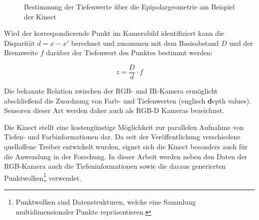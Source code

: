 
\begin{figure}[ht]
	\begin{center}
		\caption{Bestimmung der Tiefenwerte über die Epipolargeometrie am Beispiel der Kinect}
		\label{fig.kinect_depth}
	\end{center}
\end{figure}

\prever{
}

Wird der korrespondierende Punkt im Kamerabild identifiziert kann die Disparität $d = x - x'$ berechnet und zusammen mit dem Basisabstand $D$ und der Brennweite $f$ darüber der Tiefenwert des Punktes bestimmt werden:


\prever{
}

\begin{equation}
z = \frac{D}{d}\cdot f
\end{equation}

Die bekannte Relation zwischen der RGB- und IR-Kamera ermöglicht abschließend die Zuordnung von Farb- und Tiefenwerten (englisch \textbf{d}epth values). Sensoren dieser Art werden daher auch als RGB-D Kameras bezeichnet.\\


Die Kinect stellt eine kostengünstige Möglichkeit zur parallelen Aufnahme von Tiefen- und Farbinformationen dar. Da seit der Veröffentlichung verschiedene quelloffene Treiber entwickelt wurden, eignet sich die Kinect besonders auch für die Anwendung in der Forschung. In dieser Arbeit werden neben den Daten der RGB-Kamera auch die Tiefeninformationen sowie die daraus generierten Punktwolken\footnote{Punktwolken sind Datenstrukturen, welche eine Sammlung multidimensionaler Punkte repräsentieren.
} verwendet.

